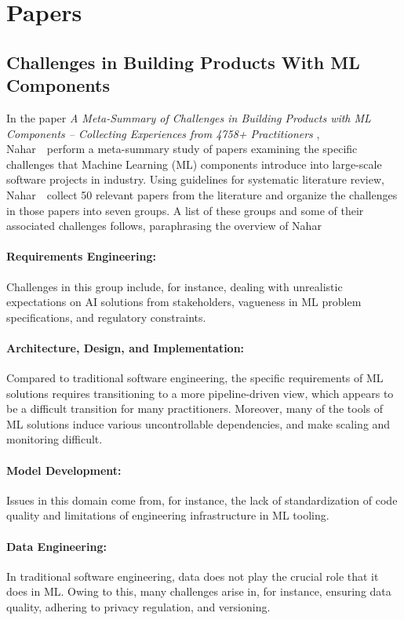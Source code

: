 \section*{Papers}

\subsection*{Challenges in Building Products With ML Components }
In the paper \emph{A Meta-Summary of Challenges in Building Products
with ML Components – Collecting Experiences from 4758+ Practitioners} \cite{NZLZK23Meta}, Nahar~\etal\ perform a meta-summary study of papers examining the specific challenges that Machine Learning (ML) components introduce into large-scale software projects in industry. Using guidelines for systematic literature review, Nahar~\etal\ collect 50 relevant papers from the literature and organize the challenges in those papers into seven groups. A list of these groups and some of their associated challenges follows, paraphrasing the overview of Nahar~\etal 

    \paragraph{Requirements Engineering:} Challenges in this group include, for instance, dealing with unrealistic expectations on AI solutions from stakeholders, vagueness in ML problem specifications, and regulatory constraints.

    \paragraph{Architecture, Design, and Implementation:} Compared to traditional software engineering, the specific requirements of ML solutions requires transitioning to a more pipeline-driven view, which appears to be a difficult transition for many practitioners. Moreover, many of the tools of ML solutions induce various uncontrollable dependencies, and make scaling and monitoring difficult. 

    \paragraph{Model Development:} Issues in this domain come from, for instance, the lack of standardization of code quality and limitations of engineering infrastructure in ML tooling. 

    \paragraph{Data Engineering:} In traditional software engineering, data does not play the crucial role that it does in ML. Owing to this, many challenges arise in, for instance, ensuring data quality, adhering to privacy regulation, and versioning.

